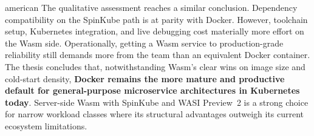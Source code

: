 \begin{otherlanguage*}{american}
The qualitative assessment reaches a similar conclusion. Dependency compatibility on the SpinKube path is at parity with Docker. However, toolchain setup, Kubernetes integration, and live debugging cost materially more effort on the Wasm side. Operationally, getting a Wasm service to production-grade reliability still demands more from the team than an equivalent Docker container. The thesis concludes that, notwithstanding Wasm's clear wins on image size and cold-start density, \textbf{Docker remains the more mature and productive default for general-purpose microservice architectures in Kubernetes today}. Server-side Wasm with SpinKube and WASI Preview~2 is a strong choice for narrow workload classes where its structural advantages outweigh its current ecosystem limitations.

\end{otherlanguage*}
